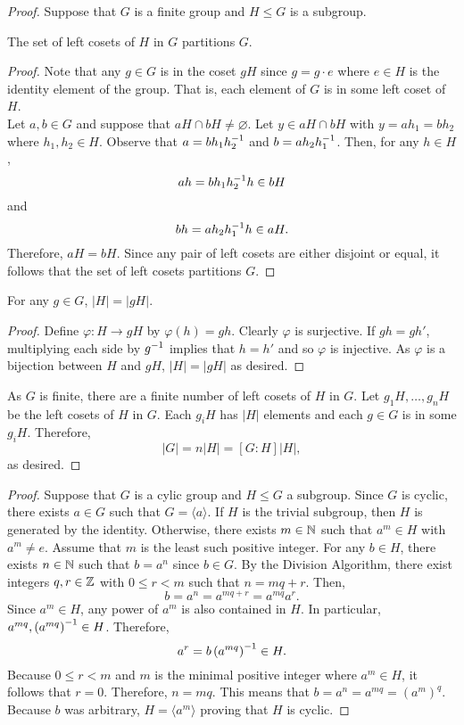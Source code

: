 \documentclass[../AlgebraQualSolutions.tex]{subfiles}
\begin{document}
	\begin{proof}
		Suppose that $G$ is a finite group and $H \leq G$ is a subgroup.

		\begin{claim}
			The set of left cosets of $H$ in $G$ partitions $G$.

			\begin{proof}
				Note that any $g \in G$ is in the coset $gH$ since $g = g\cdot e$ where $e \in H$ is the identity element of the group. That is, each element of $G$ is in some left coset of $H$.\\

				Let $a,b \in G$ and suppose that $aH \cap bH \neq \varnothing$. Let $y \in aH \cap bH$ with $y = ah_1 = bh_2$ where $h_1,h_2 \in H$. Observe that $a = bh_1h_2^{-1}$ and $b = ah_2h_1^{-1}$. Then, for any $h \in H$,
					\[ah = bh_1h_2^{-1} h \in bH \]
				and
					\[bh = ah_2h_1^{-1} h \in aH.\]
				Therefore, $aH = bH$. Since any pair of left cosets are either disjoint or equal, it follows that the set of left cosets partitions $G$.
			\end{proof}
		\end{claim}

		\begin{claim}
			For any $g \in G$, $|H| = |gH|$.

			\begin{proof}
				Define $\varphi: H \to gH$ by $\varphi(h) = gh$. Clearly $\varphi$ is surjective. If $gh = gh'$, multiplying each side by $g^{-1}$ implies that $h = h'$ and so $\varphi$ is injective. As $\varphi$ is a bijection between $H$ and $gH$, $|H| = |gH|$ as desired. 
			\end{proof}
		\end{claim}

		As $G$ is finite, there are a finite number of left cosets of $H$ in $G$. Let $g_1H, \ldots, g_nH$ be the left cosets of $H$ in $G$. Each $g_iH$ has $|H|$ elements and each $g \in G$ is in some $g_iH$. Therefore,
			\[|G| = n|H| = [G:H]|H|,\]
		as desired.
	\end{proof}

	\begin{proof}
		Suppose that $G$ is a cylic group and $H \leq G$ a subgroup. Since $G$ is cyclic, there exists $a \in G$ such that $G = \langle a \rangle$. If $H$ is the trivial subgroup, then $H$ is generated by the identity. Otherwise, there exists $m \in \mathbb{N}$ such that $a^m \in H$ with $a^m \neq e$. Assume that $m$ is the least such positive integer. For any $b \in H$, there exists $n \in \mathbb{N}$ such that $b = a^n$ since $b \in G$. By the Division Algorithm, there exist integers $q,r \in \mathbb{Z}$ with $0 \leq r < m$ such that $n = mq + r$. Then,
			\[b = a^n = a^{mq+r} = a^{mq}a^r.\]
		Since $a^m \in H$, any power of $a^m$ is also contained in $H$. In particular, $a^{mq}, \left(a^{mq}\right)^{-1} \in H$. Therefore,
			\[a^r = b \left(a^{mq}\right)^{-1} \in H.\]
		Because $0 \leq r < m$ and $m$ is the minimal positive integer where $a^m \in H$, it follows that $r = 0$. Therefore, $n = mq$. This means that $b = a^n=a^{mq} = (a^m)^q$. Because $b$ was arbitrary, $H = \langle a^m \rangle$ proving that $H$ is cyclic.
	\end{proof}
\end{document}
